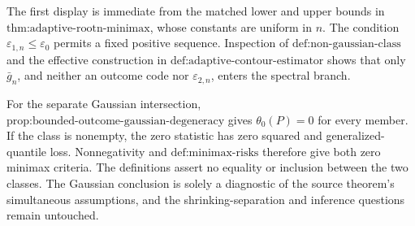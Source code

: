 The first display is immediate from the matched lower and upper bounds in \(\text{thm:adaptive-rootn-minimax}\), whose constants are uniform in \(n\).  The condition \(\varepsilon_{1,n}\le\varepsilon_0\) permits a fixed positive sequence.  Inspection of \(\text{def:non-gaussian-class}\) and the effective construction in \(\text{def:adaptive-contour-estimator}\) shows that only \(\bar g_n\), and neither an outcome code nor \(\varepsilon_{2,n}\), enters the spectral branch.

For the separate Gaussian intersection, \(\text{prop:bounded-outcome-gaussian-degeneracy}\) gives \(\theta_0(P)=0\) for every member.  If the class is nonempty, the zero statistic has zero squared and generalized-quantile loss.  Nonnegativity and \(\text{def:minimax-risks}\) therefore give both zero minimax criteria.  The definitions assert no equality or inclusion between the two classes.  The Gaussian conclusion is solely a diagnostic of the source theorem's simultaneous assumptions, and the shrinking-separation and inference questions remain untouched.